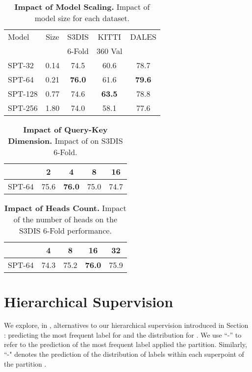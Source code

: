 \begin{table}[H]
\caption{\textbf{Impact of Model Scaling.} Impact of model size for each dataset.}
\label{tab:scalingablation}
\centering
\small{
\begin{tabular}{@{}lcccc@{}}
    \toprule
    Model & Size & S3DIS & KITTI & DALES \\
     &  & 6-Fold & 360 Val & \\
    \midrule
    SPT-32  & 0.14 & 74.5 & 60.6 & 78.7 \\
    SPT-64  & 0.21 & \bf 76.0 & 61.6 & \bf 79.6 \\
    SPT-128 & 0.77 & 74.6 & \bf 63.5 & 78.8 \\
    SPT-256 & 1.80 & 74.0 & 58.1 & 77.6 \\
    \bottomrule
\end{tabular}}
\end{table} \begin{table}[H]
\caption{\textbf{Impact of Query-Key Dimension.} Impact of  on S3DIS 6-Fold.}
\label{tab:qkdimablation}
\centering
\small{
\begin{tabular}{@{}ccccc@{}}
    \toprule
      & 2 & 4 & 8 & 16 \\
    \midrule
    SPT-64 & 75.6 & \bf 76.0 & 75.0 & 74.7 \\
    \bottomrule
\end{tabular}}
\end{table} \begin{table}[H]
\caption{\textbf{Impact of Heads Count.} Impact of the number of heads  on the S3DIS 6-Fold performance.}
\label{tab:headsablation}
\centering
\small{
\begin{tabular}{@{}ccccc@{}}
    \toprule
     & 4 & 8 & 16 & 32 \\
    \midrule
   SPT-64 &  74.3 & 75.2 & \bf 76.0 & 75.9 \\
    \bottomrule
\end{tabular}}
\end{table} 
\section{Hierarchical Supervision}
\label{sec:lossablation}

We explore, in , alternatives to our hierarchical supervision introduced in Section \textcolor{red}{} : predicting the most frequent label for  and the distribution for .
We use ``-'' to refer to the prediction of the most frequent label applied  the  partition. Similarly, ``-" denotes the prediction of the distribution of labels within each superpoint of the partition . 

